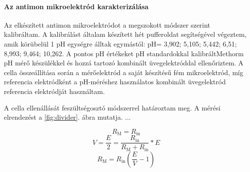 \paragraph{Az antimon mikroelektród karakterizálása}
Az elkészített antimon mikroelektródot a megszokott módszer szerint kalibráltam. A kalibrálást általam készített hét pufferoldat segítségével végeztem, amik körübelül 1 pH egységre álltak egymástól: pH= 3,902; 5,105; 5,442; 6,51; 8,993; 9,464; 10,262. A pontos pH értékeket pH standardokkal kalibráltMethorm pH mérő készülékkel és hozzá tartozó kombinált üvegelektróddal ellenőriztem. A cella összeállítása során a mérőelektród a saját készítésű fém mikroelektród, míg referencia elektródként a pH-méréshez használatos kombinált üvegelektród referencia elektródját használtam.

A cella ellenállását feszültségosztó módszerrel határoztam meg. A mérési elrendezést a \ref{fig:divider}. ábra mutatja. ...

\begin{equation}
R_\text{M} = R_\text{in}
\end{equation}
\begin{equation}
V = \frac{E}{2} = \frac{R_\text{in}}{R_\text{M} + R_\text{in}} * E
\end{equation}
\begin{equation}
R_\text{M} = R_\text{in} (\frac{E}{V} -1)
\end{equation}

